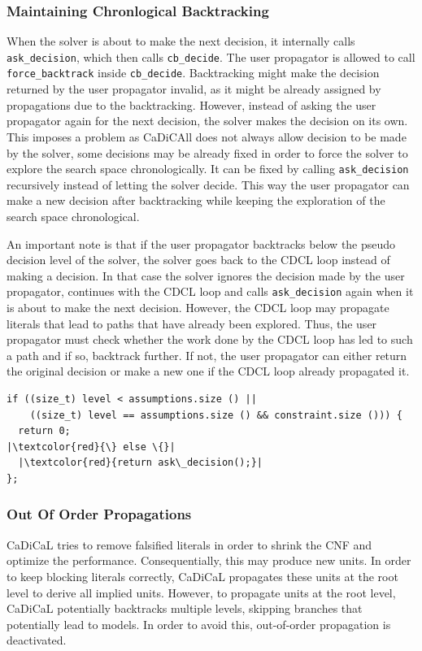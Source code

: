 \documentclass[12pt,a4paper]{article}
\begin{document}
\subsubsection{Maintaining Chronlogical Backtracking}

When the solver is about to make the next decision, it internally calls \verb|ask_decision|, which then calls \verb|cb_decide|. The user propagator is allowed to call \verb|force_backtrack| inside \verb|cb_decide|. Backtracking might make the decision returned by the user propagator invalid, as it might be already assigned by propagations due to the backtracking. However, instead of asking the user propagator again for the next decision, the solver makes the decision on its own. This imposes a problem as CaDiCAll does not always allow decision to be made by the solver, some decisions may be already fixed in order to force the solver to explore the search space chronologically. It can be fixed by calling \verb|ask_decision| recursively instead of letting the solver decide. This way the user propagator can make a new decision after backtracking while keeping the exploration of the search space chronological.

An important note is that if the user propagator backtracks below the pseudo decision level of the solver, the solver goes back to the CDCL loop instead of making a decision. In that case the solver ignores the decision made by the user propagator, continues with the CDCL loop and calls \verb|ask_decision| again when it is about to make the next decision. However, the CDCL loop may propagate literals that lead to paths that have already been explored. Thus, the user propagator must check whether the work done by the CDCL loop has led to such a path and if so, backtrack further. If not, the user propagator can either return the original decision or make a new one if the CDCL loop already propagated it.

\begin{verbatim}
if ((size_t) level < assumptions.size () ||
    ((size_t) level == assumptions.size () && constraint.size ())) {
  return 0;
|\textcolor{red}{\} else \{}|
  |\textcolor{red}{return ask\_decision();}|
};
\end{verbatim}

\subsubsection{Out Of Order Propagations}

CaDiCaL tries to remove falsified literals in order to shrink the CNF and optimize the performance. Consequentially, this may produce new units. In order to keep blocking literals correctly, CaDiCaL propagates these units at the root level to derive all implied units. However, to propagate units at the root level, CaDiCaL potentially backtracks multiple levels, skipping branches that potentially lead to models. In order to avoid this, out-of-order propagation is deactivated.
\end{document}
